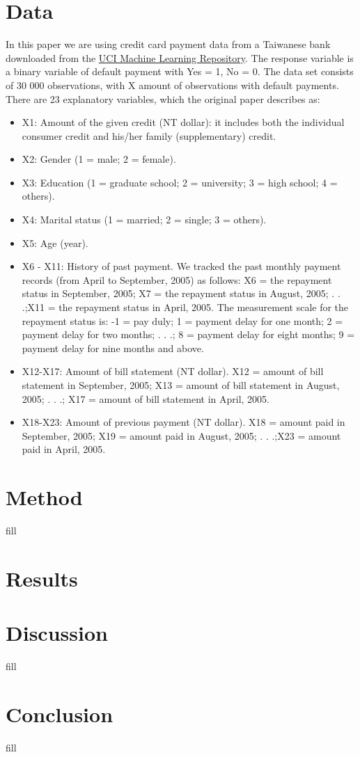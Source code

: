 \documentclass[a4paper, 11pt, twocolumn]{article}
\begin{document}
\section{Data}
In this paper we are using credit card payment data from a Taiwanese bank downloaded from the \href{https://archive.ics.uci.edu/ml/datasets/default+of+credit+card+clients}{UCI Machine Learning Repository}. The response variable is a binary variable of default payment with Yes = 1, No = 0.  The data set consists of 30 000 observations, with X amount of observations with default payments. There are 23 explanatory variables, which the original paper describes as:
\begin{itemize}[leftmargin=5mm]
\item X1: Amount of the given credit (NT dollar): it includes both the individual consumer credit and his/her family (supplementary) credit.
\item X2: Gender (1 = male; 2 = female).
\item X3: Education (1 = graduate school; 2 = university; 3 = high school; 4 = others).
\item X4: Marital status (1 = married; 2 = single; 3 = others).
\item X5: Age (year).
\item X6 - X11: History of past payment. We tracked the past monthly payment records (from April to September, 2005) as follows: X6 = the repayment status in September, 2005; X7 = the repayment status in August, 2005; . . .;X11 = the repayment status in April, 2005. The measurement scale for the repayment status is: -1 = pay duly; 1 = payment delay for one month; 2 = payment delay for two months; . . .; 8 = payment delay for eight months; 9 = payment delay for nine months and above.
\item X12-X17: Amount of bill statement (NT dollar). X12 = amount of bill statement in September, 2005; X13 = amount of bill statement in August, 2005; . . .; X17 = amount of bill statement in April, 2005.
\item X18-X23: Amount of previous payment (NT dollar). X18 = amount paid in September, 2005; X19 = amount paid in August, 2005; . . .;X23 = amount paid in April, 2005.
\end{itemize}



\section{Method}
fill



\section{Results}



\section{Discussion}
fill
\section{Conclusion}
fill


\end{document}
